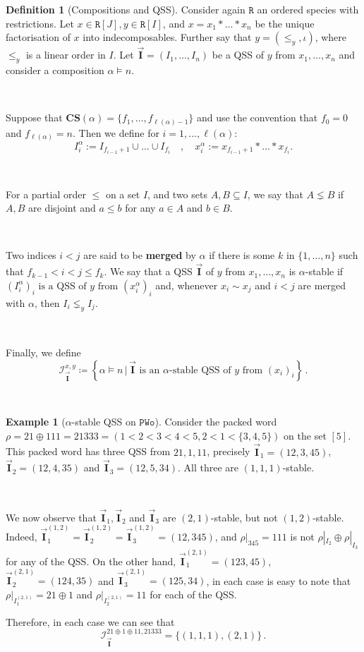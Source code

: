 \documentclass[12pt, reqno]{amsart}
\theoremstyle{definition}
\newtheorem{defin}[thm]{Definition}
\newtheorem{smpl}[thm]{Example}
\newcommand{\III}{\vec{\mathbf{I}}}
\begin{document}
\begin{defin}[Compositions and QSS]
Consider again $\mathtt{R}$ an ordered species with restrictions.
Let $x \in \mathtt{R}[J], y \in  \mathtt{R}[I]$, and $x = x_1\ast \dots \ast x_n$ be the unique factorisation of $x$ into indecomposables.
Further say that $y = (\leq_y, \iota)$, where $\leq_y$ is a linear order in $I$.
Let $\III = (I_1, \dots , I_n)$ be a QSS of $y$ from $x_1, \dots, x_n$ and consider a composition $\alpha \models n$.

\

Suppose that $ \mathbf{CS} (\alpha) = \{f_1, \dots, f_{\ell(\alpha) - 1} \}$ and use the convention that $f_0 = 0$ and $f_{\ell(\alpha)} = n$. 
Then we define for $i = 1, \dots, \ell(\alpha)$:
\[I^{\alpha}_i := I_{f_{i-1} + 1} \cup \dots \cup I_{f_i} \quad , \quad x^{\alpha}_i := x_{f_{i-1} + 1} \ast \dots \ast x_{f_i}.\]

\

For a partial order $\leq$ on a set $I$, and two sets $A, B \subseteq I$, we say that $A \lneq B$ if $A, B$ are disjoint and $a \leq b$ for any $a \in A$ and $b \in B$.

\

Two indices $i< j$ are said to be \textbf{merged} by $\alpha$ if there is some $k$ in $\{1, \dots, n\}$ such that $ f_{k-1} < i < j \leq f_k$.
We say that a QSS $\III$ of $y$ from $x_1, \dots , x_n$ is $\alpha $-stable if $(I^{\alpha}_i)_i \text{ is a QSS of $y$ from } (x^{\alpha}_i)_i$ and, whenever $x_i \sim x_j$ and $i < j$ are merged with $\alpha $, then $I_i \lneq_y I_j$.

\

Finally, we define 
\begin{equation}
   \mathcal I^{x, y}_{\III} \coloneqq \left\{ \alpha \models n \,\Big| \,\III \text{ is an $\alpha$-stable QSS of $y$ from } (x_i)_i \right\} \, . 
\end{equation}
\end{defin}

\

\begin{smpl}[$\alpha$-stable QSS on $\mathtt{PWo}$]
Consider the packed word $\rho = 21 \oplus 111 = 21333 = (1 < 2 < 3 < 4 < 5, 2 < 1 < \{3, 4, 5\})$ on the set $[5]$.
This packed word has three QSS from $21, 1, 11$, precisely $\III_1 =(12, 3, 45)$, $\III_2 =(12, 4, 35)$ and $\III_3 =(12, 5, 34)$.
All three are $(1, 1, 1)$-stable.

\

We now observe that $\III_1, \III_2$ and $\III_3$ are $(2, 1)$-stable, but not $(1, 2)$-stable.
Indeed, $\III_1^{(1, 2)} = \III_2^{(1, 2)} = \III_3^{(1, 2)} = (12, 345)$, and $\rho|_{345} = 111$ is not $\rho|_{I_2} \oplus \rho|_{I_3}$ for any of the QSS.
On the other hand, $\III_1^{(2, 1)} = (123, 45)$, $\III_2^{(2, 1)} = (124, 35)$ and $\III_3^{(2, 1)} = (125, 34)$, in each case is easy to note that $\rho|_{I_1^{(2, 1)}} = 21\oplus 1$ and $\rho|_{I_2^{(2, 1)}} = 11$ for each of the QSS.

Therefore, in each case we can see that
$$\mathcal I_{\III}^{21\oplus 1\oplus 11, 21333} = \{(1, 1, 1), (2, 1)\}\, . $$
\end{smpl}
\end{document}
